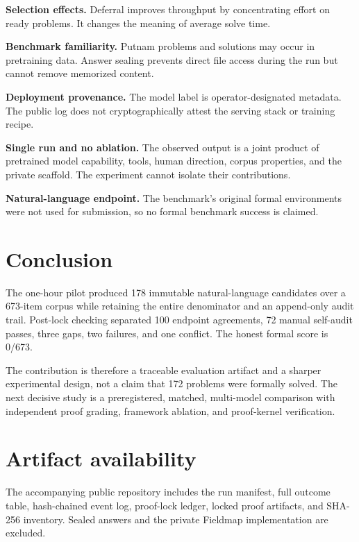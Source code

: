 \documentclass[10pt]{article}
\begin{document}
\textbf{Selection effects.} Deferral improves throughput by concentrating effort on ready problems. It changes the meaning of average solve time.

\textbf{Benchmark familiarity.} Putnam problems and solutions may occur in pretraining data. Answer sealing prevents direct file access during the run but cannot remove memorized content.

\textbf{Deployment provenance.} The model label is operator-designated metadata. The public log does not cryptographically attest the serving stack or training recipe.

\textbf{Single run and no ablation.} The observed output is a joint product of pretrained model capability, tools, human direction, corpus properties, and the private scaffold. The experiment cannot isolate their contributions.

\textbf{Natural-language endpoint.} The benchmark's original formal environments were not used for submission, so no formal benchmark success is claimed.

\section{Conclusion}
The one-hour pilot produced 178 immutable natural-language candidates over a 673-item corpus while retaining the entire denominator and an append-only audit trail. Post-lock checking separated 100 endpoint agreements, 72 manual self-audit passes, three gaps, two failures, and one conflict. The honest formal score is 0/673.

The contribution is therefore a traceable evaluation artifact and a sharper experimental design, not a claim that 172 problems were formally solved. The next decisive study is a preregistered, matched, multi-model comparison with independent proof grading, framework ablation, and proof-kernel verification.

\section*{Artifact availability}
The accompanying public repository includes the run manifest, full outcome table, hash-chained event log, proof-lock ledger, locked proof artifacts, and SHA-256 inventory. Sealed answers and the private Fieldmap implementation are excluded.
\end{document}
